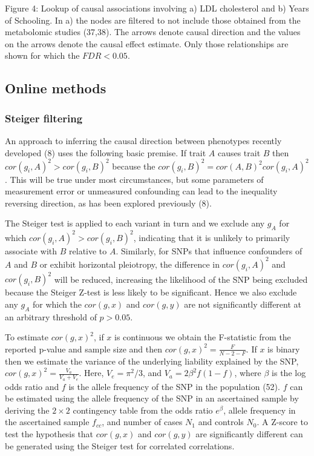 \documentclass[]{article}
\begin{document}
Figure 4: Lookup of causal associations involving a) LDL cholesterol and
b) Years of Schooling. In a) the nodes are filtered to not include those
obtained from the metabolomic studies (37,38). The arrows denote causal
direction and the values on the arrows denote the causal effect
estimate. Only those relationships are shown for which the
\(FDR < 0.05\).

\newpage

\subsection{Online methods}\label{online-methods}

\subsubsection{Steiger filtering}\label{steiger-filtering-1}

An approach to inferring the causal direction between phenotypes
recently developed (8) uses the following basic premise. If trait \(A\)
causes trait \(B\) then \(cor(g_{i}, A)^2 > cor(g_{i}, B)^2\) because
the \(cor(g_{i}, B)^2 = cor(A, B)^{2} cor(g_{i}, A)^{2}\). This will be
true under most circumstances, but some parameters of measurement error
or unmeasured confounding can lead to the inequality reversing
direction, as has been explored previously (8).

The Steiger test is applied to each variant in turn and we exclude any
\(g_{A}\) for which \(cor(g_{i}, A)^2 > cor(g_{i}, B)^2\), indicating
that it is unlikely to primarily associate with \(B\) relative to \(A\).
Similarly, for SNPs that influence confounders of \(A\) and \(B\) or
exhibit horizontal pleiotropy, the difference in \(cor(g_{i}, A)^2\) and
\(cor(g_{i}, B)^2\) will be reduced, increasing the likelihood of the
SNP being excluded because the Steiger Z-test is less likely to be
significant. Hence we also exclude any \(g_{A}\) for which the
\(cor(g, x)\) and \(cor(g, y)\) are not significantly different at an
arbitrary threshold of \(p > 0.05\).

To estimate \(cor(g, x)^2\), if \(x\) is continuous we obtain the
F-statistic from the reported p-value and sample size and then
\(cor(g, x)^2 = \frac{F}{N - 2 - F}\). If \(x\) is binary then we
estimate the variance of the underlying liability explained by the SNP,
\(cor(g, x)^2 = \frac{V_a}{V_a + V_e}\). Here, \(V_e = \pi^2/3\), and
\(V_a = 2\beta^2f(1-f)\), where \(\beta\) is the log odds ratio and
\(f\) is the allele frequency of the SNP in the population (52). \(f\)
can be estimated using the allele frequency of the SNP in an ascertained
sample by deriving the \(2 \times 2\) contingency table from the odds
ratio \(e^\beta\), allele frequency in the ascertained sample
\(f_{cc}\), and number of cases \(N_1\) and controls \(N_0\). A Z-score
to test the hypothesis that \(cor(g, x)\) and \(cor(g, y)\) are
significantly different can be generated using the Steiger test for
correlated correlations.
\end{document}
